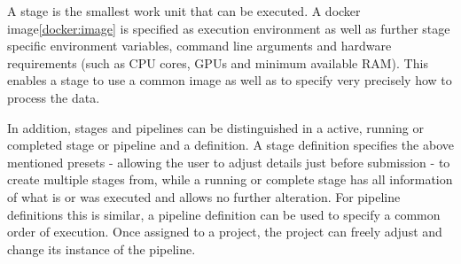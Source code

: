 A stage is the smallest work unit that can be executed.
A docker image\autoref{docker:image} is specified as execution environment as well as further stage specific environment variables, command line arguments and hardware requirements (such as CPU cores, GPUs and minimum available RAM).
This enables a stage to use a common image as well as to specify very precisely how to process the data.

In addition, stages and pipelines can be distinguished in a active, running or completed stage or pipeline and a definition.
A stage definition specifies the above mentioned presets - allowing the user to adjust details just before submission - to create multiple stages from, while a running or complete stage has all information of what is or was executed and allows no further alteration.
For pipeline definitions this is similar, a pipeline definition can be used to specify a common order of execution.
Once assigned to a project, the project can freely adjust and change its instance of the pipeline.


